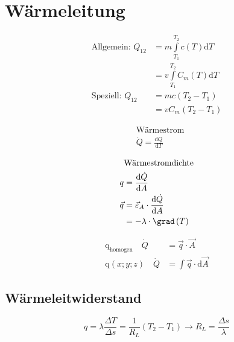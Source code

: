 \newpage
\section{Wärmeleitung}
\begin{multicols}{2}
  \begin{align*}
   \text{Allgemein: } Q_{12} &= m \int\limits_{T_1}^{T_2}c\left(T\right)\text{d}T \\
			     &= v \int\limits_{T_1}^{T_2}C_m\left(T\right)\text{d}T \\
   \text{Speziell: } Q_{12}  &=  mc\left(T_2 - T_1 \right) \\
			     &= vC_m \left(T_2 - T_1 \right) 
  \end{align*}

  \begin{align*}
   &\text{Wärmestrom}\\
   &\dot{Q}=\frac{\text{d}Q}{\text{d}T}
  \end{align*}

  \begin{align*}
   &\text{Wärmestromdichte}\\
   q&=\frac{\text{d}\dot{Q}}{\text{d}A}\\
   \vec{q}&=\vec{\varepsilon}_A\cdot\frac{\text{d}\dot{Q}}{\text{d}A}\\
		     &=-\lambda\cdot \grad\left(T\right)
  \end{align*}

  \begin{align*}
   \text{q}_{\text{homogen}} \quad \dot{Q}&=\vec{q}\cdot\vec{A}\\
   \text{q}\left(x;y;z\right) \quad \dot{Q}&=\int\vec{q}\cdot\text{d}\vec{A}
  \end{align*}

\end{multicols}

\subsection{Wärmeleitwiderstand}
\[q=\lambda\frac{\Delta T}{\Delta s} = \frac{1}{R_L}\left( T_2 - T_1 \right) \longrightarrow R_L = \frac{\Delta s}{\lambda}\]

